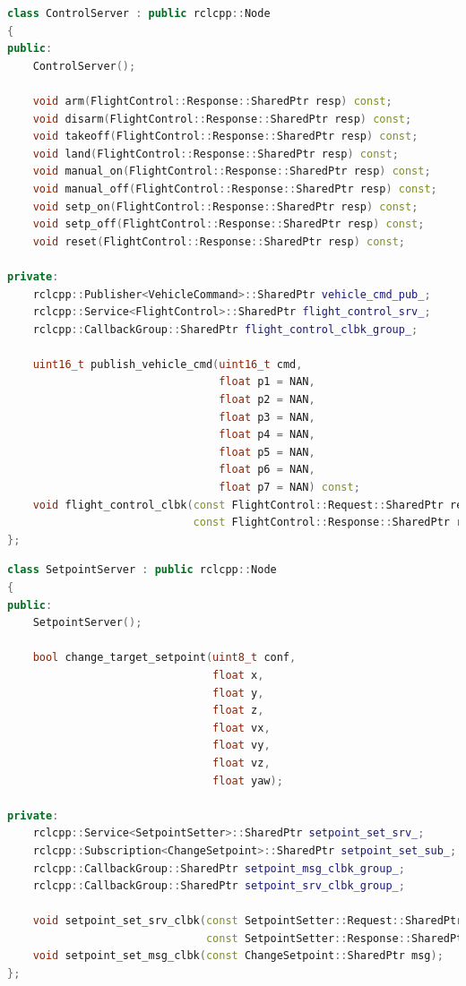 \begin{lstlisting}[language=C++, caption={Definizione del nodo \emph{control\_server}.}, label={lst:ctrlserver}]
class ControlServer : public rclcpp::Node
{
public:
    ControlServer();

    void arm(FlightControl::Response::SharedPtr resp) const;
    void disarm(FlightControl::Response::SharedPtr resp) const;
    void takeoff(FlightControl::Response::SharedPtr resp) const;
    void land(FlightControl::Response::SharedPtr resp) const;
    void manual_on(FlightControl::Response::SharedPtr resp) const;
    void manual_off(FlightControl::Response::SharedPtr resp) const;
    void setp_on(FlightControl::Response::SharedPtr resp) const;
    void setp_off(FlightControl::Response::SharedPtr resp) const;
    void reset(FlightControl::Response::SharedPtr resp) const;

private:
    rclcpp::Publisher<VehicleCommand>::SharedPtr vehicle_cmd_pub_;
    rclcpp::Service<FlightControl>::SharedPtr flight_control_srv_;
    rclcpp::CallbackGroup::SharedPtr flight_control_clbk_group_;

    uint16_t publish_vehicle_cmd(uint16_t cmd,
                                 float p1 = NAN,
                                 float p2 = NAN,
                                 float p3 = NAN,
                                 float p4 = NAN,
                                 float p5 = NAN,
                                 float p6 = NAN,
                                 float p7 = NAN) const;
    void flight_control_clbk(const FlightControl::Request::SharedPtr request,
                             const FlightControl::Response::SharedPtr response);
};
\end{lstlisting}
\clearpage

\begin{lstlisting}[language=C++, caption={Definizione del nodo \emph{setpoint\_server}.}, label={lst:setpserver}]
class SetpointServer : public rclcpp::Node
{
public:
    SetpointServer();

    bool change_target_setpoint(uint8_t conf,
                                float x,
                                float y,
                                float z,
                                float vx,
                                float vy,
                                float vz,
                                float yaw);

private:
    rclcpp::Service<SetpointSetter>::SharedPtr setpoint_set_srv_;
    rclcpp::Subscription<ChangeSetpoint>::SharedPtr setpoint_set_sub_;
    rclcpp::CallbackGroup::SharedPtr setpoint_msg_clbk_group_;
    rclcpp::CallbackGroup::SharedPtr setpoint_srv_clbk_group_;

    void setpoint_set_srv_clbk(const SetpointSetter::Request::SharedPtr request,
                               const SetpointSetter::Response::SharedPtr response);
    void setpoint_set_msg_clbk(const ChangeSetpoint::SharedPtr msg);
};
\end{lstlisting}
\clearpage

